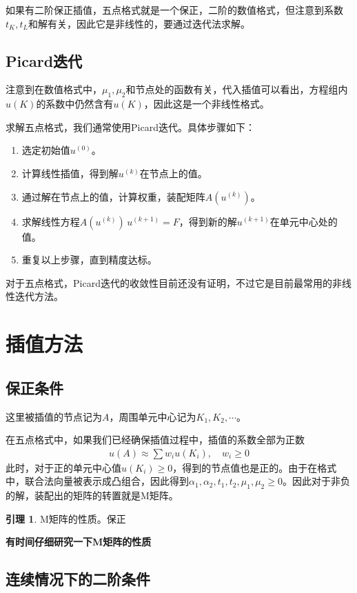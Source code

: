 \documentclass[12pt,a4paper]{article}
\theoremstyle{definition}
\newtheorem{lemma}{引理}
\begin{document}
如果有二阶保正插值，五点格式就是一个保正，二阶的数值格式，但注意到系数$t_K,t_L$和解有关，因此它是非线性的，要通过迭代法求解。

\subsection{Picard迭代}

注意到在数值格式中，$\mu_1,\mu_2$和节点处的函数有关，代入插值可以看出，方程组内$u(K)$的系数中仍然含有$u(K)$，因此这是一个非线性格式。

求解五点格式，我们通常使用Picard迭代。具体步骤如下：
\begin{enumerate}
\item 选定初始值$u^{(0)}$。
\item 计算线性插值，得到解$u^{(k)}$在节点上的值。
\item 通过解在节点上的值，计算权重，装配矩阵$A(u^{(k)})$。
\item 求解线性方程$A(u^{(k)}) \, u^{(k+1)} = F$，得到新的解$u^{(k+1)}$在单元中心处的值。
\item 重复以上步骤，直到精度达标。
\end{enumerate}

对于五点格式，Picard迭代的收敛性目前还没有证明，不过它是目前最常用的非线性迭代方法。

\section{插值方法}

\subsection{保正条件}

这里被插值的节点记为$A$，周围单元中心记为$K_1, K_2, \cdots$。

在五点格式中，如果我们已经确保插值过程中，插值的系数全部为正数
\begin{align*}
u(A) \approx \sum w_{i} u(K_i), \quad w_{i} \geq 0
\end{align*}
此时，对于正的单元中心值$u(K_i) \geq 0$，得到的节点值也是正的。由于在格式中，联合法向量被表示成凸组合，因此得到$\alpha_1, \alpha_2, t_1, t_2, \mu_1, \mu_2 \geq 0$。因此对于非负的解，装配出的矩阵的转置就是M矩阵。

\begin{lemma}
M矩阵的性质。保正
\end{lemma}
\textbf{有时间仔细研究一下M矩阵的性质}

\subsection{连续情况下的二阶条件}
\end{document}
